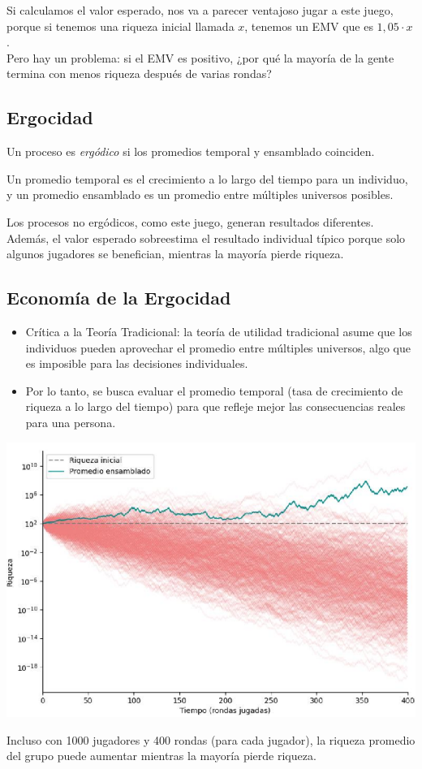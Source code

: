 \documentclass{article}
\begin{document}
            Si calculamos el valor esperado, nos va a parecer ventajoso jugar a este juego, porque si tenemos una riqueza inicial llamada $x$, tenemos un EMV que es $1,05 \cdot x$.\\
            Pero hay un problema: si el EMV es positivo, ¿por qué la mayoría de la gente termina con menos riqueza después de varias rondas?
        \subsection*{Ergocidad}
            Un proceso es \emph{ergódico} si los promedios temporal y ensamblado coinciden.

            Un promedio temporal es el crecimiento a lo largo del tiempo para un individuo, y un promedio ensamblado es un promedio entre múltiples universos posibles.

            Los procesos no ergódicos, como este juego, generan resultados diferentes. Además, el valor esperado sobreestima el resultado individual típico porque solo algunos jugadores se benefician, mientras la mayoría pierde riqueza.
        \subsection*{Economía de la Ergocidad}
            \begin{itemize}
                \item Crítica a la Teoría Tradicional: la teoría de utilidad tradicional asume que los individuos pueden aprovechar el promedio entre múltiples universos, algo que es imposible para las decisiones individuales.
                \item Por lo tanto, se busca evaluar el promedio temporal (tasa de crecimiento de riqueza a lo largo del tiempo) para que refleje mejor las consecuencias reales para una persona.
            \end{itemize}
            \begin{center}
                \includegraphics[width=0.85 \linewidth]{figs/ergocidad.png}
            \end{center}
             Incluso con 1000 jugadores y 400 rondas (para cada jugador), la riqueza promedio del grupo puede aumentar mientras la mayoría pierde riqueza.
\end{document}

